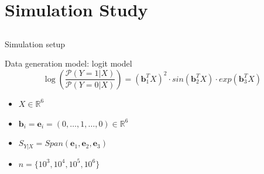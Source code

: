 \documentclass[ignorenonframetext,]{beamer}
\begin{document}
\section{Simulation Study}\label{simulation-study}

\subsection{}\label{section}

\begin{frame}{Simulation setup}

\begin{block}{Data generation model: logit model}
\[
    \log\left(\frac{\mathcal{P}(Y=1|X)}{\mathcal{P}(Y=0|X)}\right) = (\mathbf{b}_1^TX)^2 \cdot sin(\mathbf{b}_2^TX) \cdot exp(\mathbf{b}_3^TX)
\]
\begin{itemize}
\item $X \in \mathbb{R}^6$   
\item $\mathbf{b}_i = \mathbf{e}_i = (0, \dots, 1, \dots,0) \in \mathbb{R}^6$  
\item $S_{Y|X} = Span(\mathbf{e}_1, \mathbf{e}_2, \mathbf{e}_3)$   
\item $n = \{10^3, 10^4, 10^5,10^6\}$    
\end{itemize}
\end{block}

\end{frame}
\end{document}
